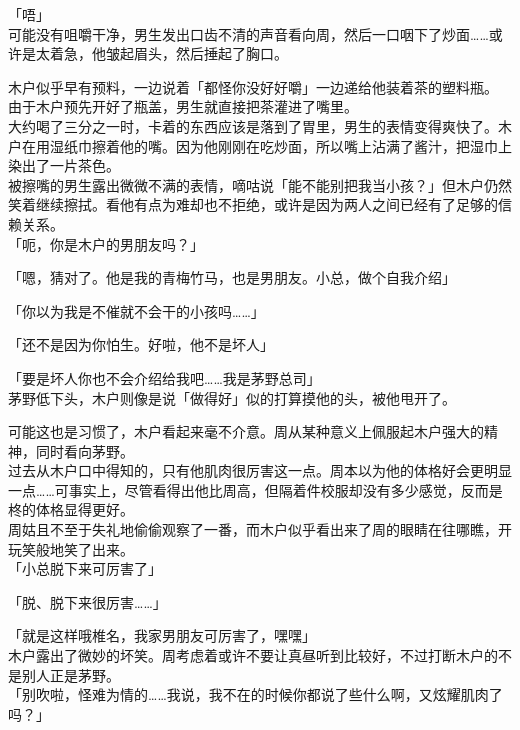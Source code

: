 「唔」\\

可能没有咀嚼干净，男生发出口齿不清的声音看向周，然后一口咽下了炒面……或许是太着急，他皱起眉头，然后捶起了胸口。

木户似乎早有预料，一边说着「都怪你没好好嚼」一边递给他装着茶的塑料瓶。\\

由于木户预先开好了瓶盖，男生就直接把茶灌进了嘴里。\\

大约喝了三分之一时，卡着的东西应该是落到了胃里，男生的表情变得爽快了。木户在用湿纸巾擦着他的嘴。因为他刚刚在吃炒面，所以嘴上沾满了酱汁，把湿巾上染出了一片茶色。\\

被擦嘴的男生露出微微不满的表情，嘀咕说「能不能别把我当小孩？」但木户仍然笑着继续擦拭。看他有点为难却也不拒绝，或许是因为两人之间已经有了足够的信赖关系。\\

「呃，你是木户的男朋友吗？」

「嗯，猜对了。他是我的青梅竹马，也是男朋友。小总，做个自我介绍」

「你以为我是不催就不会干的小孩吗……」

「还不是因为你怕生。好啦，他不是坏人」

「要是坏人你也不会介绍给我吧……我是茅野总司」\\

茅野低下头，木户则像是说「做得好」似的打算摸他的头，被他甩开了。

可能这也是习惯了，木户看起来毫不介意。周从某种意义上佩服起木户强大的精神，同时看向茅野。\\

过去从木户口中得知的，只有他肌肉很厉害这一点。周本以为他的体格好会更明显一点……可事实上，尽管看得出他比周高，但隔着件校服却没有多少感觉，反而是柊的体格显得更好。\\

周姑且不至于失礼地偷偷观察了一番，而木户似乎看出来了周的眼睛在往哪瞧，开玩笑般地笑了出来。\\

「小总脱下来可厉害了」

「脱、脱下来很厉害……」

「就是这样哦椎名，我家男朋友可厉害了，嘿嘿」\\

木户露出了微妙的坏笑。周考虑着或许不要让真昼听到比较好，不过打断木户的不是别人正是茅野。\\

「别吹啦，怪难为情的……我说，我不在的时候你都说了些什么啊，又炫耀肌肉了吗？」

